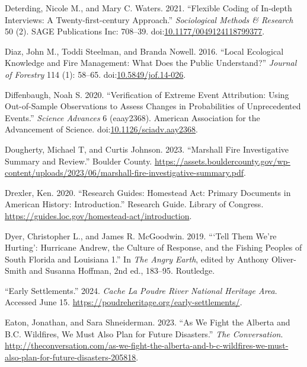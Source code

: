 \documentclass[
]{article}
\newlength{\cslhangindent}
\newenvironment{CSLReferences}[2] %
 {\begin{list}{}{%
  \setlength{\itemindent}{0pt}
  \setlength{\leftmargin}{0pt}
  \setlength{\parsep}{0pt}
  \ifodd #1
   \setlength{\leftmargin}{\cslhangindent}
   \setlength{\itemindent}{-1\cslhangindent}
  \fi
  \setlength{\itemsep}{#2\baselineskip}}}
 {\end{list}}
\begin{document}
\begin{CSLReferences}{1}{0}
Deterding, Nicole M., and Mary C. Waters. 2021. {``Flexible {Coding} of {In-depth Interviews}: {A Twenty-first-century Approach}.''} \emph{Sociological Methods \& Research} 50 (2). SAGE Publications Inc: 708--39. doi:\href{https://doi.org/10.1177/0049124118799377}{10.1177/0049124118799377}.

Diaz, John M., Toddi Steelman, and Branda Nowell. 2016. {``Local {Ecological Knowledge} and {Fire Management}: {What Does} the {Public Understand}?''} \emph{Journal of Forestry} 114 (1): 58--65. doi:\href{https://doi.org/10.5849/jof.14-026}{10.5849/jof.14-026}.

Diffenbaugh, Noah S. 2020. {``Verification of Extreme Event Attribution: {Using} Out-of-Sample Observations to Assess Changes in Probabilities of Unprecedented Events.''} \emph{Science Advances} 6 (eaay2368). American Association for the Advancement of Science. doi:\href{https://doi.org/10.1126/sciadv.aay2368}{10.1126/sciadv.aay2368}.

Dougherty, Michael T, and Curtis Johnson. 2023. {``Marshall {Fire Investigative Summary} and {Review}.''} Boulder County. \url{https://assets.bouldercounty.gov/wp-content/uploads/2023/06/marshall-fire-investigative-summary.pdf}.

Drexler, Ken. 2020. {``Research {Guides}: {Homestead Act}: {Primary Documents} in {American History}: {Introduction}.''} Research Guide. Library of Congress. \url{https://guides.loc.gov/homestead-act/introduction}.

Dyer, Christopher L., and James R. McGoodwin. 2019. {``{`{Tell Them We}'re {Hurting}'}: {Hurricane Andrew}, the {Culture} of {Response}, and the {Fishing Peoples} of {South Florida} and {Louisiana} 1.''} In \emph{The {Angry Earth}}, edited by Anthony Oliver-Smith and Susanna Hoffman, 2nd ed., 183--95. Routledge.

{``Early {Settlements}.''} 2024. \emph{Cache La Poudre River National Heritage Area}. Accessed June 15. \url{https://poudreheritage.org/early-settlements/}.

Eaton, Jonathan, and Sara Shneiderman. 2023. {``As We Fight the {Alberta} and {B}.{C}. Wildfires, We Must Also Plan for Future Disasters.''} \emph{The Conversation}. \url{http://theconversation.com/as-we-fight-the-alberta-and-b-c-wildfires-we-must-also-plan-for-future-disasters-205818}.


\end{CSLReferences}
\end{document}
